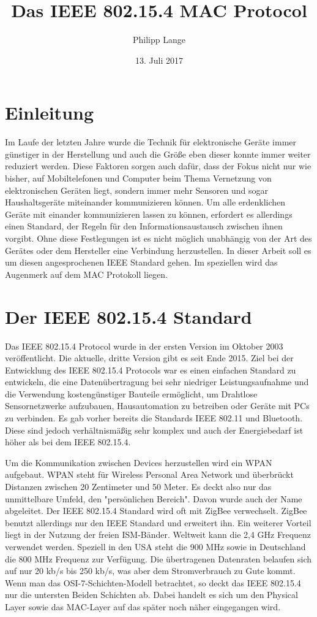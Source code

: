 \documentclass[a4paper, 12pt]{scrreprt}
\title{Das IEEE 802.15.4 MAC Protocol}
\author{Philipp Lange}
\date{13. Juli 2017}
\begin{document}
\maketitle
\tableofcontents

\newpage
\chapter{Einleitung}
Im Laufe der letzten Jahre wurde die Technik für elektronische Geräte immer günstiger in der Herstellung und auch die Größe eben dieser konnte immer weiter reduziert werden. Diese Faktoren sorgen auch dafür, dass der Fokus nicht nur wie bisher, auf Mobiltelefonen und Computer beim Thema Vernetzung von elektronischen Geräten liegt, sondern immer mehr Sensoren und sogar Haushaltsgeräte miteinander kommunizieren können.
Um alle erdenklichen Geräte mit einander kommunizieren lassen zu können, erfordert es allerdings einen Standard, der Regeln für den Informationsaustausch zwischen ihnen vorgibt. Ohne diese Festlegungen ist es nicht möglich unabhängig von der Art des Gerätes oder dem Hersteller eine Verbindung herzustellen.
In dieser Arbeit soll es um diesen angesprochenen IEEE Standard gehen. Im speziellen wird das Augenmerk auf dem MAC Protokoll liegen.

\chapter{Der IEEE 802.15.4 Standard}
Das IEEE 802.15.4 Protocol wurde in der ersten Version im Oktober 2003 veröffentlicht. Die aktuelle, dritte Version gibt es seit Ende 2015. \cite{Karl2007}
Ziel bei der Entwicklung des IEEE 802.15.4 Protocols war es einen einfachen Standard zu entwickeln, die eine Datenübertragung bei sehr niedriger Leistungsaufnahme und die Verwendung kostengünstiger Bauteile ermöglicht, um Drahtlose Sensornetzwerke aufzubauen, Hausautomation zu betreiben oder Geräte mit PCs zu verbinden. Es gab vorher bereits die Standards IEEE 802.11 und Bluetooth. Diese sind jedoch verhältnismäßig sehr komplex und auch der Energiebedarf ist höher als bei dem IEEE 802.15.4.
\cite{WikiIEEE}

Um die Kommunikation zwischen Devices herzustellen wird ein WPAN aufgebaut. WPAN steht für Wireless Personal Area Network und überbrückt Distanzen zwischen 20 Zentimeter und 50 Meter. Es deckt also nur das unmittelbare Umfeld, den "persönlichen Bereich". Davon wurde auch der Name abgeleitet.
Der IEEE 802.15.4 Standard wird oft mit ZigBee verwechselt. ZigBee benutzt allerdings nur den IEEE Standard und erweitert ihn.
Ein weiterer Vorteil liegt in der Nutzung der freien ISM-Bänder. Weltweit kann die 2,4 GHz Frequenz verwendet werden. Speziell in den USA steht die 900 MHz sowie in Deutschland die 800 MHz Frequenz zur Verfügung.
Die übertragenen Datenraten belaufen sich auf nur 20 kb/s bis 250 kb/s, was aber dem Stromverbrauch zu Gute kommt.
Wenn man das OSI-7-Schichten-Modell betrachtet, so deckt das IEEE 802.15.4 nur die untersten Beiden Schichten ab. Dabei handelt es sich um den Physical Layer sowie das MAC-Layer auf das später noch näher eingegangen wird.
\end{document}
